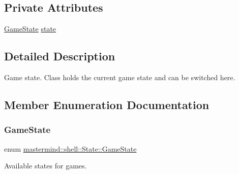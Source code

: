\subsection*{Private Attributes}
\begin{DoxyCompactItemize}
\item 
\hyperlink{classmastermind_1_1shell_1_1_state_a7667dd4920335355f616e9ffc2793d0b}{Game\+State} \hyperlink{classmastermind_1_1shell_1_1_state_a499c4fed4175dd2cc71d325882d3049e}{state}
\end{DoxyCompactItemize}


\subsection{Detailed Description}
Game state. Class holds the current game state and can be switched here. 

\subsection{Member Enumeration Documentation}
\hypertarget{classmastermind_1_1shell_1_1_state_a7667dd4920335355f616e9ffc2793d0b}{}\label{classmastermind_1_1shell_1_1_state_a7667dd4920335355f616e9ffc2793d0b} 
\subsubsection{\texorpdfstring{Game\+State}{GameState}}
{\footnotesize\ttfamily enum \hyperlink{classmastermind_1_1shell_1_1_state_a7667dd4920335355f616e9ffc2793d0b}{mastermind\+::shell\+::\+State\+::\+Game\+State}\hspace{0.3cm}{\ttfamily [strong]}}



Available states for games. 

